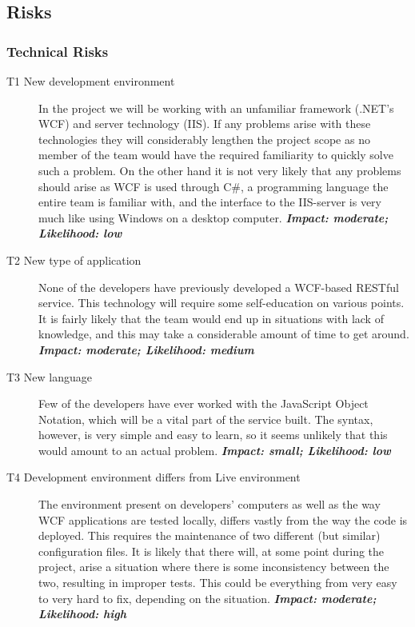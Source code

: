 \subsection{Risks}
\label{app:risks-appendix}

\subsubsection{Technical Risks}
\begin{description}
    \item[T1 New development environment] In the project we will be working with an unfamiliar
        framework (.NET’s WCF) and server technology (IIS). If any problems arise with these
        technologies they will considerably lengthen the project scope as no member of the team
        would have the required familiarity to quickly solve such a problem. On the other hand
        it is not very likely that any problems should arise as WCF is used through C\#, a
        programming language the entire team is familiar with, and the interface to the IIS-server
        is very much like using Windows on a desktop computer.\newline
        \textbf{\emph{Impact: moderate; Likelihood: low}}
    \item[T2 New type of application] None of the developers have previously developed a WCF-based
        RESTful service. This technology will require some self-education on various points. It is
        fairly likely that the team would end up in situations with lack of knowledge, and this may
        take a considerable amount of time to get around.\newline
        \textbf{\emph{Impact: moderate; Likelihood: medium}}
    \item[T3 New language] Few of the developers have ever worked with the JavaScript Object Notation,
        which will be a vital part of the service built. The syntax, however, is very simple and easy
        to learn, so it seems unlikely that this would amount to an actual problem.\newline
        \textbf{\emph{Impact: small; Likelihood: low}}
    \item[T4 Development environment differs from Live environment] The environment present on
        developers' computers as well as the way WCF applications are tested locally, differs vastly
        from the way the code is deployed. This requires the maintenance of two different (but similar)
        configuration files. It is likely that there will, at some point during the project, arise a
        situation where there is some inconsistency between the two, resulting in improper tests. This
        could be everything from very easy to very hard to fix, depending on the situation.\newline
        \textbf{\emph{Impact: moderate; Likelihood: high}}
\end{description}


